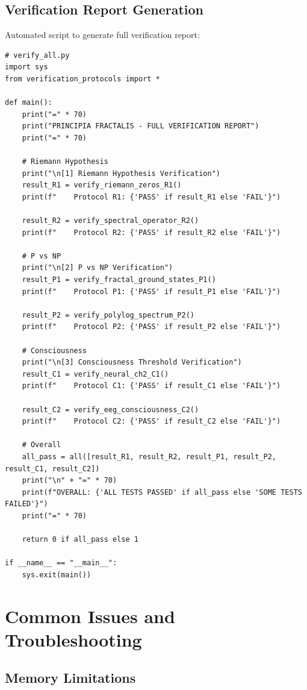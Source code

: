 \subsection{Verification Report Generation}

Automated script to generate full verification report:

\begin{verbatim}
# verify_all.py
import sys
from verification_protocols import *

def main():
    print("=" * 70)
    print("PRINCIPIA FRACTALIS - FULL VERIFICATION REPORT")
    print("=" * 70)

    # Riemann Hypothesis
    print("\n[1] Riemann Hypothesis Verification")
    result_R1 = verify_riemann_zeros_R1()
    print(f"    Protocol R1: {'PASS' if result_R1 else 'FAIL'}")

    result_R2 = verify_spectral_operator_R2()
    print(f"    Protocol R2: {'PASS' if result_R2 else 'FAIL'}")

    # P vs NP
    print("\n[2] P vs NP Verification")
    result_P1 = verify_fractal_ground_states_P1()
    print(f"    Protocol P1: {'PASS' if result_P1 else 'FAIL'}")

    result_P2 = verify_polylog_spectrum_P2()
    print(f"    Protocol P2: {'PASS' if result_P2 else 'FAIL'}")

    # Consciousness
    print("\n[3] Consciousness Threshold Verification")
    result_C1 = verify_neural_ch2_C1()
    print(f"    Protocol C1: {'PASS' if result_C1 else 'FAIL'}")

    result_C2 = verify_eeg_consciousness_C2()
    print(f"    Protocol C2: {'PASS' if result_C2 else 'FAIL'}")

    # Overall
    all_pass = all([result_R1, result_R2, result_P1, result_P2, result_C1, result_C2])
    print("\n" + "=" * 70)
    print(f"OVERALL: {'ALL TESTS PASSED' if all_pass else 'SOME TESTS FAILED'}")
    print("=" * 70)

    return 0 if all_pass else 1

if __name__ == "__main__":
    sys.exit(main())
\end{verbatim}

\section{Common Issues and Troubleshooting}
\label{sec:troubleshooting}

\subsection{Memory Limitations}

